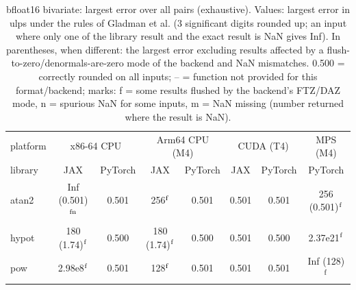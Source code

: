 \begin{table}
\centering
\begin{small}
\begin{tabular}{|l|cc|cc|cc|c|}
\hline
platform & \multicolumn{2}{c|}{x86-64 CPU} & \multicolumn{2}{c|}{Arm64 CPU (M4)} & \multicolumn{2}{c|}{CUDA (T4)} & \multicolumn{1}{c|}{MPS (M4)} \\
library & JAX & PyTorch & JAX & PyTorch & JAX & PyTorch & PyTorch \\ \hline
atan2 & Inf (0.501)$^{\rm fn}$ & 0.501 & 256$^{\rm f}$ & 0.501 & 0.501 & 0.501 & 256 (0.501)$^{\rm f}$ \\
hypot & 180 (1.74)$^{\rm f}$ & 0.500 & 180 (1.74)$^{\rm f}$ & 0.500 & 0.501 & 0.500 & 2.37e21$^{\rm f}$ \\
pow & 2.98e8$^{\rm f}$ & 0.501 & 128$^{\rm f}$ & 0.501 & 0.501 & 0.501 & Inf (128)$^{\rm f}$ \\
\hline
\end{tabular}
\end{small}
\caption{bfloat16 bivariate: largest error over all pairs (exhaustive). Values: largest error in ulps under the rules of Gladman et al. (3 significant digits rounded up; an input where only one of the library result and the exact result is NaN gives Inf). In parentheses, when different: the largest error excluding results affected by a flush-to-zero/denormals-are-zero mode of the backend and NaN mismatches. 0.500 = correctly rounded on all inputs; -- = function not provided for this format/backend; marks: f = some results flushed by the backend's FTZ/DAZ mode, n = spurious NaN for some inputs, m = NaN missing (number returned where the result is NaN). }
\label{tab:bfloat16bi}
\end{table}

